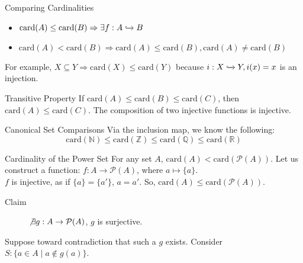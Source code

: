 \documentclass[10pt]{extarticle}
\begin{document}
  \begin{problem}{Comparing Cardinalities}
    \begin{itemize}
      \item $\text{card}(A) \leq \text{card}(B) \Rightarrow \exists f: A\xhookrightarrow{} B$ 
      \item $\text{card}(A) < \text{card}(B) \Rightarrow \text{card}(A) \leq \text{card}(B), \text{card}(A) \neq \text{card}(B)$
    \end{itemize}
    For example, $X\subseteq Y \Rightarrow \text{card}(X) \leq \text{card}(Y)$ because $i: X\xhookrightarrow{} Y, i(x) = x$ is an injection.\\

    \begin{problem}{Transitive Property}
      If $\text{card}(A) \leq \text{card}(B) \leq \text{card}(C)$, then $\text{card}(A) \leq \text{card}(C)$.
      \tcblower
      The composition of two injective functions is injective.
    \end{problem}
    \begin{problem}{Canonical Set Comparisons}
      Via the inclusion map, we know the following:
      \[
        \text{card}(\mathbb{N}) \leq \text{card}(\mathbb{Z}) \leq \text{card}(\mathbb{Q}) \leq \text{card}(\mathbb{R})
      \] 
    \end{problem}
    \begin{problem}{Cardinality of the Power Set}
      For any set $A$, $\text{card}(A) < \text{card}(\mathcal{P}(A))$.
      \tcblower
      Let us construct a function: $f: A \rightarrow \mathcal{P}(A)$, where $a \mapsto \{a\}$.\\

      $f$ is injective, as if $\{a\} = \{a'\}$, $a = a'$. So, $\text{card}(A) \leq \text{card}(\mathcal{P}(A))$.
      \begin{description}
        \item[Claim] $\not\exists g: A\rightarrow \mathcal{P}(A)$, $g$ is surjective.
      \end{description}
      Suppose toward contradiction that such a $g$ exists. Consider $S: \{a\in A \mid a\notin g(a)\}$.\\


\end{problem}
\end{problem}
\end{document}
